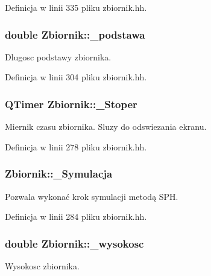 Definicja w linii 335 pliku zbiornik.\-hh.

\hypertarget{class_zbiornik_aff57d3fb370566986df4eb58711cbfae}{
\subsubsection[{\-\_\-podstawa}]{\setlength{\rightskip}{0pt plus 5cm}double Zbiornik\-::\-\_\-podstawa\hspace{0.3cm}{\ttfamily [private]}}}\label{class_zbiornik_aff57d3fb370566986df4eb58711cbfae}
Dlugosc podstawy zbiornika. 

Definicja w linii 304 pliku zbiornik.\-hh.

\hypertarget{class_zbiornik_a5ca8ac1357ef59110d4a9e12aae2bd99}{
\subsubsection[{\-\_\-\-Stoper}]{\setlength{\rightskip}{0pt plus 5cm}Q\-Timer Zbiornik\-::\-\_\-\-Stoper}}\label{class_zbiornik_a5ca8ac1357ef59110d4a9e12aae2bd99}
Miernik czasu zbiornika. Sluzy do odswiezania ekranu. 

Definicja w linii 278 pliku zbiornik.\-hh.

\hypertarget{class_zbiornik_a2d1f5a0b8fb0085afcd66b730d6dd6a8}{
\subsubsection[{\-\_\-\-Symulacja}]{ Zbiornik\-::\-\_\-\-Symulacja}}\label{class_zbiornik_a2d1f5a0b8fb0085afcd66b730d6dd6a8}
Pozwala wykonać krok symulacji metodą S\-P\-H. 

Definicja w linii 284 pliku zbiornik.\-hh.

\hypertarget{class_zbiornik_abe4d7a4e2d39e802d656b03bb3afdd3f}{
\subsubsection[{\-\_\-wysokosc}]{\setlength{\rightskip}{0pt plus 5cm}double Zbiornik\-::\-\_\-wysokosc\hspace{0.3cm}{\ttfamily [private]}}}\label{class_zbiornik_abe4d7a4e2d39e802d656b03bb3afdd3f}
Wysokosc zbiornika. 


